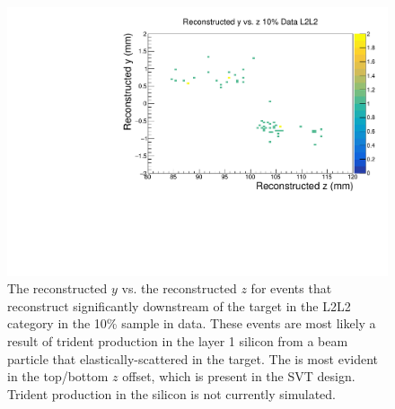 \begin{figure}[t]
    \centering
    \includegraphics[width=.85\textwidth]{figs/Results/y_z_L2L2.pdf}
    \caption{The reconstructed $y$ vs. the reconstructed $z$ for events that reconstruct significantly downstream of the target in the L2L2 category in the 10\% sample in data. These events are most likely a result of trident production in the layer 1 silicon from a beam particle that elastically-scattered in the target. The is most evident in the top/bottom $z$ offset, which is present in the SVT design. Trident production in the silicon is not currently simulated.}
    \label{fig:yz_L2L2}
\end{figure}